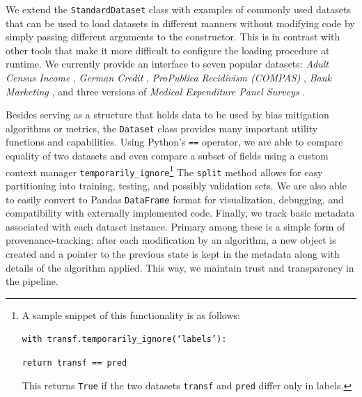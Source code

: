 \documentclass{article}
\begin{document}
We extend the \texttt{StandardDataset} class with examples of commonly used datasets that can be used to load datasets in different manners without modifying code by simply passing different arguments to the constructor. This is in contrast with other tools that make it more difficult to configure the loading procedure at runtime. We currently provide an interface to seven popular datasets: \textit{Adult Census Income} \cite{Adult_Dataset}, \textit{German Credit} \cite{German_Dataset}, \textit{ProPublica Recidivism (COMPAS)} \cite{Compas_Dataset}, \textit{Bank Marketing} \cite{Bank_Dataset}, and three versions of \textit{Medical Expenditure Panel Surveys} \cite{MEPS_Dataset_15,MEPS_Dataset_16}.

Besides serving as a structure that holds data to be used by bias mitigation algorithms or metrics, the \texttt{Dataset} class provides many important utility functions and capabilities. Using Python's \texttt{==} operator, we are able to compare equality of two datasets and even compare a subset of fields using a custom context manager \texttt{temporarily\_ignore}\footnote{A sample snippet of this functionality is as follows:

\texttt{with transf.temporarily\_ignore(`labels'):}

\texttt{\hspace{6ex}return transf == pred}

This returns \texttt{True} if the two datasets \texttt{transf} and \texttt{pred} differ only in labels.
} The \texttt{split} method allows for easy partitioning into training, testing, and possibly validation sets. We are also able to easily convert to Pandas \texttt{DataFrame} format for visualization, debugging, and compatibility with externally implemented code. Finally, we track basic metadata associated with each dataset instance. Primary among these is a simple form of provenance-tracking: after each modification by an algorithm, a new object is created and a pointer to the previous state is kept in the metadata along with details of the algorithm applied. This way, we maintain trust and transparency in the pipeline.

\end{document}
